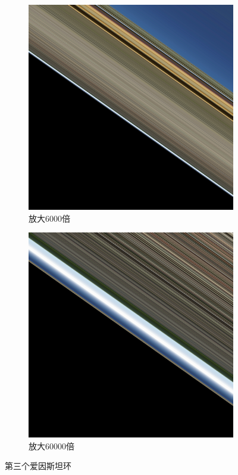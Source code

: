 \begin{figure}[H]
    \centering
    \begin{subfigure}{.45\textwidth}
        \centering
        \includegraphics[width=.8\linewidth]{images/zoomin_6000x.png}
        \caption{放大6000倍}
        \label{fig:zoomin-6000x}
    \end{subfigure}
    \begin{subfigure}{.45\textwidth}
        \centering
        \includegraphics[width=.8\linewidth]{images/zoomin_60000x.png}
        \caption{放大60000倍}
        \label{fig:zoomin-60000x}
    \end{subfigure}
    \caption{第三个爱因斯坦环}
\end{figure}


